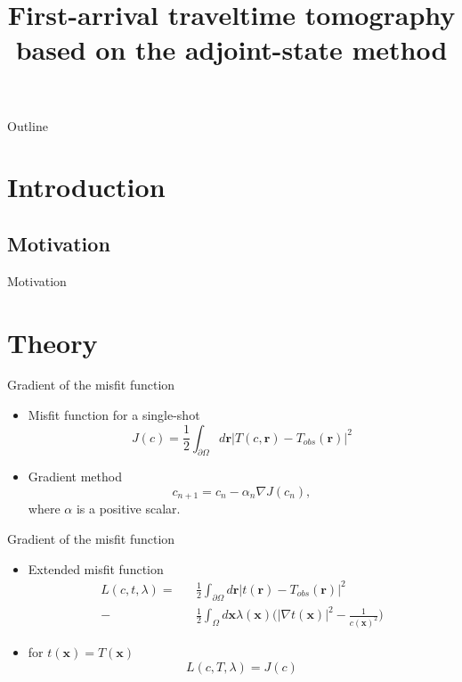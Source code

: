 \documentclass{beamer}
\title{First-arrival traveltime tomography based on the adjoint-state method}
\begin{document}
 
 \begin{frame}
  \titlepage
 \end{frame}

 \begin{frame}{Outline}
  \tableofcontents
 \end{frame}
 
 \section{Introduction}
 
 \subsection{Motivation}
 
 \begin{frame}{Motivation}
  
 \end{frame}

 \section{Theory}
 
 \begin{frame}{Gradient of the misfit function}
  \begin{itemize}
   \item Misfit function for a single-shot
   \begin{equation}
    J({c}) = \frac{1}{2}\int_{\partial\Omega}d\boldsymbol{r}|T({c},\boldsymbol{r}) - T_{obs}(\boldsymbol{r})|^2
   \end{equation}
   \item Gradient method
   \begin{equation}
    {c}_{n+1} = {c}_n - \alpha_n\nabla J({c}_n),
   \end{equation}
    where $\alpha$ is a positive scalar.
  \end{itemize}
 \end{frame}

 \begin{frame}{Gradient of the misfit function}
  \begin{itemize}
   \item Extended misfit function
   \begin{eqnarray}
    L({c},t,\lambda) = &&\frac{1}{2}\int_{\partial\Omega}d\boldsymbol{r}|t(\boldsymbol{r}) - T_{obs}(\boldsymbol{r})|^2 \nonumber \\
    - &&\frac{1}{2}\int_\Omega d\boldsymbol{x}\lambda(\boldsymbol{x})\bigg(|\nabla t(\boldsymbol{x})|^2 - \frac{1}{{c}(\boldsymbol{x})^2}\bigg)
   \end{eqnarray}
   \item for $t(\boldsymbol{x}) = T(\boldsymbol{x})$
   \begin{equation}
    L({c},T,\lambda) = J({c})
   \end{equation}
  \end{itemize}
 \end{frame}
 
\end{document}
